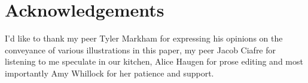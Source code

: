\documentclass[prbg,preprint]{revtex4-1}
\begin{document}
\section{Acknowledgements}

I'd like to thank my peer Tyler Markham for expressing his opinions on the conveyance of various illustrations in this paper, my peer Jacob Ciafre for listening to me speculate in our kitchen, Alice Haugen for prose editing and most importantly Amy Whillock for her patience and support.







\end{document}
